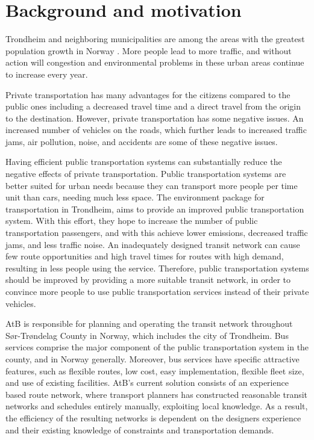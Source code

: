\section{Background and motivation}
\label{sec:backgroundAndMotivation}

Trondheim and neighboring municipalities are among the areas with the greatest population growth in Norway \citep{website:miljopakken}. More people lead to more traffic, and without action will congestion and environmental problems in these urban areas continue to increase every year. 

Private transportation has many advantages for the citizens compared to the public ones including a decreased travel time and a direct travel from the origin to the destination. However, private transportation has some negative issues. An increased number of vehicles on the roads, which further leads to increased traffic jams, air pollution, noise, and accidents are some of these negative issues. 

Having efficient public transportation systems can substantially reduce the negative effects of private transportation. Public transportation systems are better suited for urban needs because they can transport more people per time unit than cars, needing much less space. The environment package for transportation in Trondheim\citep{website:miljopakken}, aims to provide an improved public transportation system. With this effort, they hope to increase the number of public transportation passengers, and with this achieve lower emissions, decreased traffic jams, and less traffic noise. An inadequately designed transit network can cause few route opportunities and high travel times for routes with high demand, resulting in less people using the service. Therefore, public transportation systems should be improved by providing a more suitable transit network, in order to convince more people to use public transportation services instead of their private vehicles.

AtB\citep{website:atb} is responsible for planning and operating the transit network throughout Sør-Trøndelag County in Norway, which includes the city of Trondheim.  Bus services comprise the major component of the public transportation system in the county, and in Norway generally. Moreover, bus services have specific attractive features, such as flexible routes, low cost, easy implementation, flexible fleet size, and use of existing facilities. AtB's current solution consists of an experience based route network, where transport planners has constructed reasonable transit networks and schedules entirely manually, exploiting local knowledge. As a result, the efficiency of the resulting networks is dependent on the designers experience and their existing knowledge of constraints and transportation demands.

